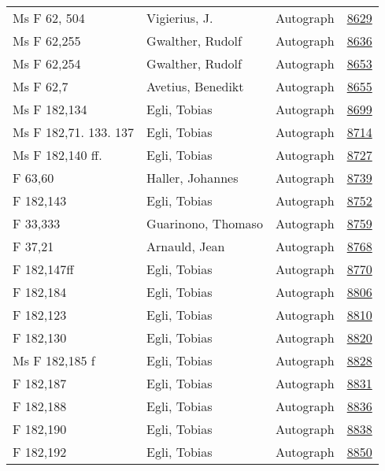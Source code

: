 \documentclass[10pt,a4paper,landscape]{report}
\begin{document}
\begin{longtable}{p{16cm}p{4cm}lr}
Ms F 62, 504	&	Vigierius, J.	&	Autograph	&	\href{http://130.60.24.72/assignment/8629}{8629}\\
Ms F 62,255	&	Gwalther, Rudolf	&	Autograph	&	\href{http://130.60.24.72/assignment/8636}{8636}\\
Ms F 62,254	&	Gwalther, Rudolf	&	Autograph	&	\href{http://130.60.24.72/assignment/8653}{8653}\\
Ms F 62,7	&	Avetius, Benedikt	&	Autograph	&	\href{http://130.60.24.72/assignment/8655}{8655}\\
Ms F 182,134	&	Egli, Tobias	&	Autograph	&	\href{http://130.60.24.72/assignment/8699}{8699}\\
Ms F 182,71. 133. 137	&	Egli, Tobias	&	Autograph	&	\href{http://130.60.24.72/assignment/8714}{8714}\\
Ms F 182,140 ff.	&	Egli, Tobias	&	Autograph	&	\href{http://130.60.24.72/assignment/8727}{8727}\\
F 63,60	&	Haller, Johannes	&	Autograph	&	\href{http://130.60.24.72/assignment/8739}{8739}\\
F 182,143	&	Egli, Tobias	&	Autograph	&	\href{http://130.60.24.72/assignment/8752}{8752}\\
F 33,333	&	Guarinono, Thomaso	&	Autograph	&	\href{http://130.60.24.72/assignment/8759}{8759}\\
F 37,21	&	Arnauld, Jean	&	Autograph	&	\href{http://130.60.24.72/assignment/8768}{8768}\\
F 182,147ff	&	Egli, Tobias	&	Autograph	&	\href{http://130.60.24.72/assignment/8770}{8770}\\
F 182,184	&	Egli, Tobias	&	Autograph	&	\href{http://130.60.24.72/assignment/8806}{8806}\\
F 182,123	&	Egli, Tobias	&	Autograph	&	\href{http://130.60.24.72/assignment/8810}{8810}\\
F 182,130	&	Egli, Tobias	&	Autograph	&	\href{http://130.60.24.72/assignment/8820}{8820}\\
Ms F 182,185 f	&	Egli, Tobias	&	Autograph	&	\href{http://130.60.24.72/assignment/8828}{8828}\\
F 182,187	&	Egli, Tobias	&	Autograph	&	\href{http://130.60.24.72/assignment/8831}{8831}\\
F 182,188	&	Egli, Tobias	&	Autograph	&	\href{http://130.60.24.72/assignment/8836}{8836}\\
F 182,190	&	Egli, Tobias	&	Autograph	&	\href{http://130.60.24.72/assignment/8838}{8838}\\
F 182,192	&	Egli, Tobias	&	Autograph	&	\href{http://130.60.24.72/assignment/8850}{8850}\\

\end{longtable}
\end{document}
